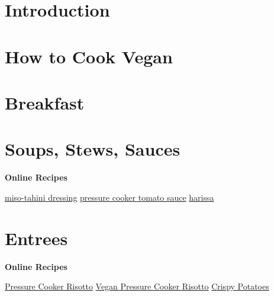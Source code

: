 \documentclass{article}
\begin{document}
\tableofcontents

\section{Introduction}


\section{How to Cook Vegan}


\section{Breakfast}




\section{Soups, Stews, \And Sauces}
\begin{center}
  \textbf{Online Recipes}
  
\href{https://smittenkitchen.com/2013/10/miso-sweet-potato-and-broccoli-bowl/}{miso-tahini dressing}
\blt
\href{https://www.seriouseats.com/pressure-cooker-tomato-sauce}{pressure cooker tomato sauce}
\blt
\href{https://smittenkitchen.com/2014/10/homemade-harissa/}{harissa}
\end{center}







\section{Entrees}

\begin{center}
  \textbf{Online Recipes}

\href{https://www.seriouseats.com/pressure-cooker-mushroom-risotto-recipe}{Pressure Cooker Risotto}
\blt
\href{https://www.seriouseats.com/pressure-cooker-miso-risotto-recipe}{Vegan Pressure Cooker Risotto}
\blt
\href{https://www.seriouseats.com/the-best-roast-potatoes-ever-recipe}{Crispy Potatoes}
\end{center}







\end{document}
